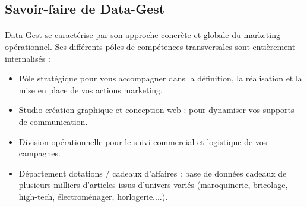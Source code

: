 \subsection{Savoir-faire de Data-Gest}
\paragraph{}
Data Gest se caractérise par son approche concrète et globale du marketing opérationnel.
Ses différents pôles de compétences transversales sont entièrement internalisés :\\[1em]
\begin{itemize}
  \item Pôle stratégique pour vous accompagner dans la définition, la réalisation et la mise en place de vos actions marketing.
  \item Studio création graphique et conception web : pour dynamiser vos supports de communication.
  \item Division opérationnelle pour le suivi commercial et logistique de vos campagnes.
  \item Département dotations / cadeaux d’affaires : base de données cadeaux de plusieurs milliers d'articles issus d'univers variés (maroquinerie, bricolage, high-tech, électroménager, horlogerie....).

\end{itemize}

